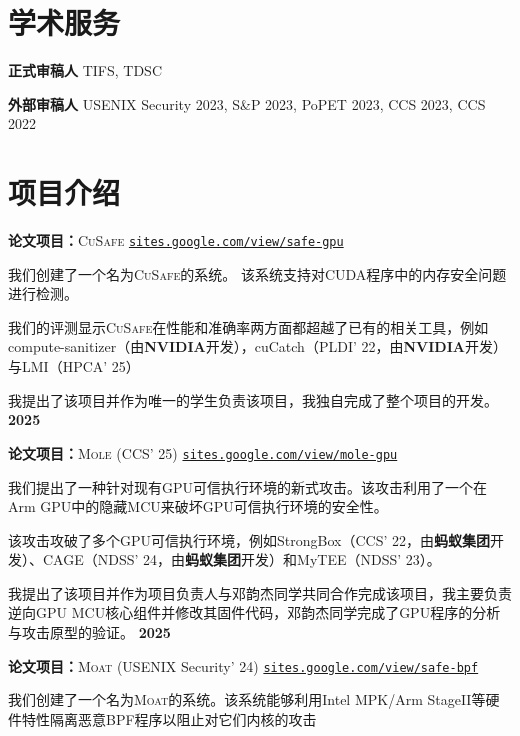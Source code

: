 \documentclass{resume}
\begin{document}
\section{\textbf{学术服务}}
\begin{content}
	\textbf{正式审稿人} \enspace TIFS, TDSC

	\textbf{外部审稿人} \enspace USENIX Security 2023, S\&P 2023, PoPET 2023, CCS 2023, CCS 2022
\end{content}

\section{\textbf{项目介绍}}

\begin{content}
	\textbf{论文项目：}\textsc{CuSafe} \enspace
	{\href{https://sites.google.com/view/safe-gpu/}{\texttt{sites.google.com/view/safe-gpu}}}

	{我们创建了一个名为\textsc{CuSafe}的系统。 该系统支持对CUDA程序中的内存安全问题进行检测。}

	{我们的评测显示\textsc{CuSafe}在性能和准确率两方面都超越了已有的相关工具，例如compute-sanitizer（由\textbf{NVIDIA}开发），cuCatch（PLDI’ 22，由\textbf{NVIDIA}开发）与LMI（HPCA’ 25）}

	{我提出了该项目并作为唯一的学生负责该项目，我独自完成了整个项目的开发。}
	\hfill {\bf 2025}


	\textbf{论文项目：}\textsc{Mole} (CCS' 25) \enspace
	{\href{https://sites.google.com/view/mole-gpu}{\texttt{sites.google.com/view/mole-gpu}}}

	{我们提出了一种针对现有GPU可信执行环境的新式攻击。该攻击利用了一个在Arm GPU中的隐藏MCU来破坏GPU可信执行环境的安全性。}

	{该攻击攻破了多个GPU可信执行环境，例如StrongBox（CCS’ 22，由\textbf{蚂蚁集团}开发）、CAGE（NDSS’ 24，由\textbf{蚂蚁集团}开发）和MyTEE（NDSS’ 23）。}

	{我提出了该项目并作为项目负责人与邓韵杰同学共同合作完成该项目，我主要负责逆向GPU MCU核心组件并修改其固件代码，邓韵杰同学完成了GPU程序的分析与攻击原型的验证。}
	\hfill{\bf 2025}


	\textbf{论文项目：}\textsc{Moat} (USENIX Security' 24) \enspace
	{\href{https://sites.google.com/view/safe-bpf/}{\texttt{sites.google.com/view/safe-bpf}}}

	{我们创建了一个名为\textsc{Moat}的系统。该系统能够利用Intel MPK/Arm StageII等硬件特性隔离恶意BPF程序以阻止对它们内核的攻击}


\end{content}
\end{document}
